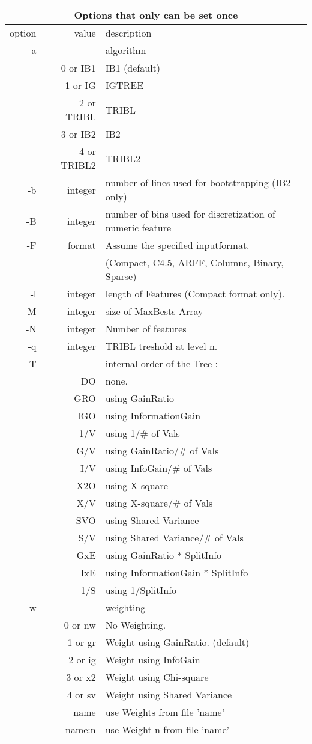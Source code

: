 \begin{tabular}{|r|r|l|}
\hline
\multicolumn{3}{|c|}{Options that only can be set {\bf once}}\\
\hline
option & value & description \\
\hline
-a &    & algorithm \\
   & 0 or IB1   & IB1     (default)\\
   & 1 or IG    & IGTREE \\
   & 2 or TRIBL & TRIBL \\
   & 3 or IB2   & IB2 \\
   & 4 or TRIBL2 & TRIBL2 \\
-b & integer  & number of lines used for bootstrapping (IB2 only)\\
-B & integer  & number of bins used for discretization of numeric feature\\
-F & format & Assume the specified inputformat. \\
 & &     (Compact, C4.5, ARFF, Columns, Binary, Sparse) \\
-l & integer & length of Features (Compact format only). \\
-M & integer & size of MaxBests Array \\
-N & integer & Number of features \\
-q & integer & TRIBL treshold at level n. \\
-T &     & internal order of the Tree : \\
   & DO  & none. \\
   & GRO & using GainRatio \\
   & IGO & using InformationGain \\
   & 1/V & using 1/\# of Vals \\
   & G/V & using GainRatio/\# of Vals \\
   & I/V & using InfoGain/\# of Vals \\
   & X2O & using X-square \\
   & X/V & using X-square/\# of Vals \\
   & SVO & using Shared Variance \\
   & S/V & using Shared Variance/\# of Vals \\
   & GxE & using GainRatio * SplitInfo \\
   & IxE & using InformationGain * SplitInfo \\
   & 1/S & using 1/SplitInfo \\
-w &  & weighting \\
   & 0 or nw & No Weighting. \\
   & 1 or gr & Weight using GainRatio. (default) \\
   & 2 or ig & Weight using InfoGain \\
   & 3 or x2 & Weight using Chi-square \\
   & 4 or sv & Weight using Shared Variance \\
   & name & use Weights from file 'name' \\
   & name:n & use Weight n from file 'name' \\
\hline
\end{tabular}

